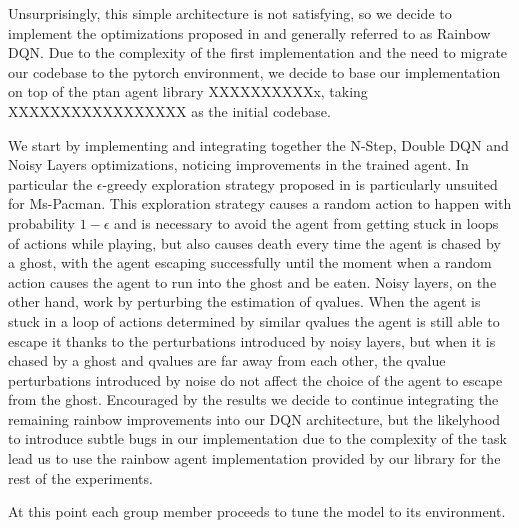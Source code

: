 \documentclass[10pt,twocolumn,letterpaper]{article}
\begin{document}
Unsurprisingly, this simple architecture is not satisfying, so we decide to implement the optimizations proposed in \cite{DBLP:journals/corr/abs-1710-02298} and generally referred to as Rainbow DQN. Due to the complexity of the first implementation and the need to migrate our codebase to the pytorch environment, we decide to base our implementation on top of the ptan agent library XXXXXXXXXXx, taking XXXXXXXXXXXXXXXXX as the initial codebase.

We start by implementing and integrating together the N-Step, Double DQN and Noisy Layers optimizations, noticing improvements in the trained agent. In particular the $\epsilon$-greedy exploration strategy proposed in \cite{DBLP:journals/corr/MnihKSGAWR13} is particularly unsuited for Ms-Pacman. This exploration strategy causes a random action to happen with probability $1 - \epsilon$ and is necessary to avoid the agent from getting stuck in loops of actions while playing, but also causes death every time the agent is chased by a ghost, with the agent escaping successfully until the moment when a random action causes the agent to run into the ghost and be eaten.
Noisy layers, on the other hand, work by perturbing the estimation of qvalues. When the agent is stuck in a loop of actions determined by similar qvalues the agent is still able to escape it thanks to the perturbations introduced by noisy layers, but when it is chased by a ghost and qvalues are far away from each other, the qvalue perturbations introduced by noise do not affect the choice of the agent to escape from the ghost.
Encouraged by the results we decide to continue integrating the remaining rainbow improvements into our DQN architecture, but the likelyhood to introduce subtle bugs in our implementation due to the complexity of the task lead us to use the rainbow agent implementation provided by our library for the rest of the experiments.

At this point each group member proceeds to tune the model to its environment.
\end{document}
